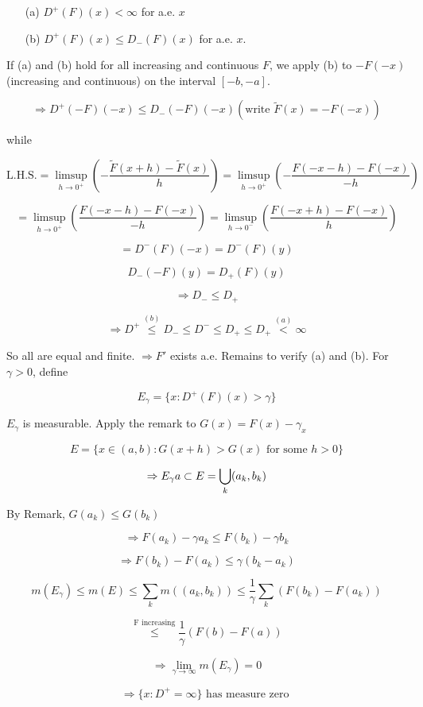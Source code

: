 \documentclass{article}
\theoremstyle{definition}
\begin{document}
\begin{itemize}
  \item[(a)] $D^+(F)(x) < \infty$ for a.e. $x$
  \item[(b)] $D^+(F)(x) \leq D_-(F)(x)$ for a.e. $x$. 
\end{itemize}

If (a) and (b) hold for all increasing and continuous $F$, we apply (b) to $-F(-x)$ (increasing and continuous) on the interval $[-b, -a]$.

$$\Rightarrow D^+(-F)(-x) \leq D_-(-F)(-x) (\text{write } \tilde{F}(x) = -F(-x))$$

while

$$\text{L.H.S.} = \limsup_{h \to 0^+} (-\frac{\tilde{F}(x+h) - \tilde{F}(x)}{h}) = \limsup_{h \to 0^+}  (-\frac{F(-x-h) - F(-x)}{-h})$$

$$ = \limsup_{h \to 0^+} (\frac{F(-x-h) - F(-x)}{-h}) = \limsup_{h \to 0^-} (\frac{F(-x+h)- F(-x)}{h})$$


$$ = D^-(F)(-x) = D^-(F)(y)$$

$$D_-(-F)(y) = D_+(F)(y)$$

$$\Rightarrow D_- \leq D_+$$

$$\Rightarrow D^+ \stackrel{(b)}{\leq} D_- \leq D^- \leq D_+ \leq D_+ \stackrel{(a)}{<} \infty$$

So all are equal and finite. $\Rightarrow F'$ exists a.e. Remains to verify (a) and (b). For $\gamma > 0$, define 

$$E_\gamma = \{x: D^+ (F)(x) > \gamma\}$$

$E_\gamma$ is measurable. Apply the remark to $G(x) = F(x) - \gamma_x$

$$E = \{x \in (a, b): G(x + h) > G(x) \text{ for some } h > 0\}$$

$$\Rightarrow E_\gamma \\ {a} \subset E = \bigcup_k (a_k, b_k)$$

By Remark, $G(a_k) \leq G(b_k)$

$$\Rightarrow F(a_k) - \gamma a_k \leq F(b_k) - \gamma b_k$$

$$\Rightarrow F(b_k) - F(a_k) \leq \gamma (b_k - a_k)$$

$$m(E_\gamma) \leq m(E) \leq \sum_k m((a_k, b_k)) \leq \frac{1}{\gamma} \sum_k (F(b_k) - F(a_k))$$

$$\stackrel{\text{F increasing}}{\leq} \frac{1}{\gamma} (F(b) - F(a))$$

$$\Rightarrow \lim_{\gamma \to \infty} m(E_\gamma) = 0$$

$$\Rightarrow \{ x : D^+ = \infty\} \text{ has measure zero }$$
\end{document}
